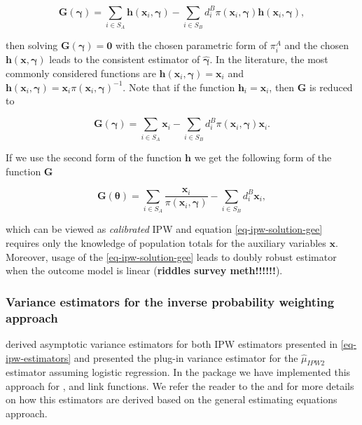 \documentclass[
]{jss}
\begin{document}
\begin{equation}
\label{gee}
\boldsymbol{G}(\boldsymbol{\gamma})=\sum_{i \in S_A} \boldsymbol{h}\left(\boldsymbol{x}_i, \boldsymbol{\gamma}\right)-\sum_{i \in S_B} d_i^B \pi\left(\boldsymbol{x}_i, \boldsymbol{\gamma}\right) \boldsymbol{h}\left(\boldsymbol{x}_i, \boldsymbol{\gamma}\right),
\end{equation}

then solving \(\boldsymbol{G}(\boldsymbol{\gamma})=\boldsymbol{0}\) with
the chosen parametric form of \(\pi_i^A\) and the chosen
\(\boldsymbol{h}(\boldsymbol{x},\boldsymbol{\gamma})\) leads to the
consistent estimator of \(\hat{\boldsymbol{\gamma}}\). In the
literature, the most commonly considered functions are
\(\boldsymbol{h}\left(\boldsymbol{x}_i, \boldsymbol{\gamma}\right) = \boldsymbol{x}_i\)
and
\(\boldsymbol{h}\left(\boldsymbol{x}_i, \boldsymbol{\gamma}\right) = \boldsymbol{x}_i \pi\left(\boldsymbol{x}_i, \boldsymbol{\gamma}\right)^{-1}\).
Note that if the function \(\boldsymbol{h}_i=\boldsymbol{x}_i\), then
\(\boldsymbol{G}\) is reduced to

\[
\boldsymbol{G}(\boldsymbol{\gamma}) = \sum_{i \in S_A} \boldsymbol{x}_i-\sum_{i \in S_B} d_i^B \pi\left(\boldsymbol{x}_i, \boldsymbol{\gamma}\right) \boldsymbol{x}_i.
\]

If we use the second form of the function \(\boldsymbol{h}\) we get the
following form of the function \(\boldsymbol{G}\)

\begin{equation}
\boldsymbol{G}(\boldsymbol{\theta}) = \sum_{i \in S_A} \frac{\boldsymbol{x}_i}{\pi\left(\boldsymbol{x}_i, \boldsymbol{\gamma}\right) }-\sum_{i \in S_B} d_i^B \boldsymbol{x}_i,
\label{eq-ipw-solution-gee}
\end{equation}

which can be viewed as \textit{calibrated} IPW and equation
\eqref{eq-ipw-solution-gee} requires only the knowledge of population
totals for the auxiliary variables \(\boldsymbol{x}\). Moreover, usage
of the \eqref{eq-ipw-solution-gee} leads to doubly robust estimator when
the outcome model is linear (\textbf{riddles survey meth!!!!!!}).

\subsubsection{Variance estimators for the inverse probability weighting
approach}\label{variance-estimators-for-the-inverse-probability-weighting-approach}

\citet[section 3.2]{chen2020doubly} derived asymptotic variance
estimators for both IPW estimators presented in
\eqref{eq-ipw-estimators} and presented the plug-in variance estimator
for the \(\hat{\mu}_{IPW2}\) estimator assuming logistic regression. In
the package we have implemented this approach for ,
 and  link functions. We refer the reader to
the \citet[section 6.2]{wu2022statistical} and
\citet[chapter 3]{chrostowski2024statistical} for more details on how
this estimators are derived based on the general estimating equations
approach.
\end{document}
